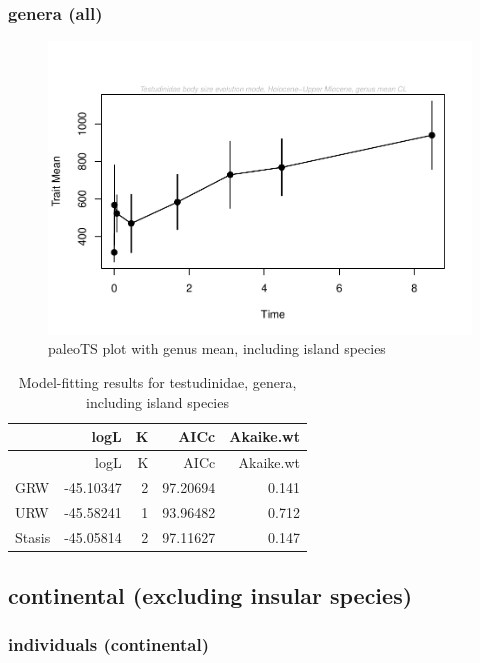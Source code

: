 \documentclass[]{article}
\begin{document}
\newpage

\subsubsection{genera (all)}\label{genera-all}

\begin{figure}[htbp]
\centering
\includegraphics{MA_JJ_files/figure-latex/paleoTS plot with genus mean, including island species-1.pdf}
\caption{paleoTS plot with genus mean, including island species}
\end{figure}

\begin{longtable}[]{@{}lrrrr@{}}
\caption{Model-fitting results for testudinidae, genera, including
island species}\tabularnewline
\toprule
& logL & K & AICc & Akaike.wt\tabularnewline
\midrule
\endfirsthead
\toprule
& logL & K & AICc & Akaike.wt\tabularnewline
\midrule
\endhead
GRW & -45.10347 & 2 & 97.20694 & 0.141\tabularnewline
URW & -45.58241 & 1 & 93.96482 & 0.712\tabularnewline
Stasis & -45.05814 & 2 & 97.11627 & 0.147\tabularnewline
\bottomrule
\end{longtable}

\newpage

\subsection{continental (excluding insular
species)}\label{continental-excluding-insular-species}

\subsubsection{individuals (continental)}\label{individuals-continental}
\end{document}
